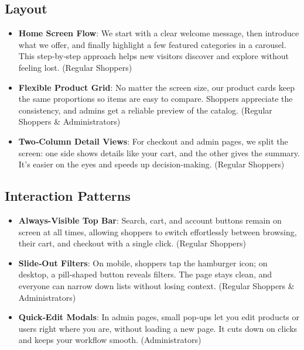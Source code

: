 \documentclass[11pt,a4paper]{article}
\begin{document}
\subsection{Layout}
\begin{itemize}
	\item \textbf{Home Screen Flow}: We start with a clear welcome message, then introduce what we offer, and finally highlight a few featured categories in a carousel. This step‑by‑step approach helps new visitors discover and explore without feeling lost. (Regular Shoppers)
	\item \textbf{Flexible Product Grid}: No matter the screen size, our product cards keep the same proportions so items are easy to compare. Shoppers appreciate the consistency, and admins get a reliable preview of the catalog. (Regular Shoppers \& Administrators)
	\item \textbf{Two‑Column Detail Views}: For checkout and admin pages, we split the screen: one side shows details like your cart, and the other gives the summary. It’s easier on the eyes and speeds up decision‑making. (Regular Shoppers)
\end{itemize}

\subsection{Interaction Patterns}
\begin{itemize}
	\item \textbf{Always-Visible Top Bar}: Search, cart, and account buttons remain on screen at all times, allowing shoppers to switch effortlessly between browsing, their cart, and checkout with a single click. (Regular Shoppers)
	
	\item \textbf{Slide‑Out Filters}: On mobile, shoppers tap the hamburger icon; on desktop, a pill‑shaped button reveals filters. The page stays clean, and everyone can narrow down lists without losing context. (Regular Shoppers \& Administrators)
	\item \textbf{Quick‑Edit Modals}: In admin pages, small pop‑ups let you edit products or users right where you are, without loading a new page. It cuts down on clicks and keeps your workflow smooth. (Administrators)
\end{itemize}
\end{document}
